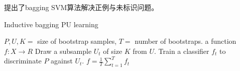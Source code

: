 
\citet{Mordelet2014201}提出了bagging SVM算法\cite{Mordelet2014201}解决正例与未标识问题。

\begin{algorithm}[htb]
\caption{Inductive bagging PU learning}
\label{alg:bagging_SVM}
\begin{algorithmic}[1]
\REQUIRE $P,U,K = $ size of bootstrap samples, $T = $ number of bootstraps.
\ENSURE a function $f: X \to R$
    \STATE Draw a subsample $U_t$ of size $K$ from $U$.
    \STATE Train a classifier $f_t$ to discriminate $P$ against $U_t$.
\ENDFOR
\RETURN $f = \frac{1}{T}\sum\limits_{t=1}^Tf_t$
\end{algorithmic}
\end{algorithm}


